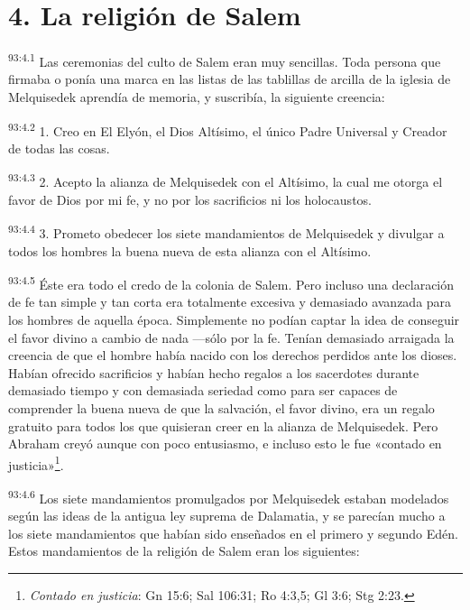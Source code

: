 \section*{4. La religión de Salem}
\par
\textsuperscript{93:4.1} Las ceremonias del culto de Salem eran muy sencillas. Toda persona que firmaba o ponía una marca en las listas de las tablillas de arcilla de la iglesia de Melquisedek aprendía de memoria, y suscribía, la siguiente creencia:

\par
\textsuperscript{93:4.2} 1. Creo en El Elyón, el Dios Altísimo, el único Padre Universal y Creador de todas las cosas.

\par
\textsuperscript{93:4.3} 2. Acepto la alianza de Melquisedek con el Altísimo, la cual me otorga el favor de Dios por mi fe, y no por los sacrificios ni los holocaustos.

\par
\textsuperscript{93:4.4} 3. Prometo obedecer los siete mandamientos de Melquisedek y divulgar a todos los hombres la buena nueva de esta alianza con el Altísimo.

\par
\textsuperscript{93:4.5} Éste era todo el credo de la colonia de Salem. Pero incluso una declaración de fe tan simple y tan corta era totalmente excesiva y demasiado avanzada para los hombres de aquella época. Simplemente no podían captar la idea de conseguir el favor divino a cambio de nada ---sólo por la fe. Tenían demasiado arraigada la creencia de que el hombre había nacido con los derechos perdidos ante los dioses. Habían ofrecido sacrificios y habían hecho regalos a los sacerdotes durante demasiado tiempo y con demasiada seriedad como para ser capaces de comprender la buena nueva de que la salvación, el favor divino, era un regalo gratuito para todos los que quisieran creer en la alianza de Melquisedek. Pero Abraham creyó aunque con poco entusiasmo, e incluso esto le fue «contado en justicia»\footnote{\textit{Contado en justicia}: Gn 15:6; Sal 106:31; Ro 4:3,5; Gl 3:6; Stg 2:23.}.

\par
\textsuperscript{93:4.6} Los siete mandamientos promulgados por Melquisedek estaban modelados según las ideas de la antigua ley suprema de Dalamatia, y se parecían mucho a los siete mandamientos que habían sido enseñados en el primero y segundo Edén. Estos mandamientos de la religión de Salem eran los siguientes:

